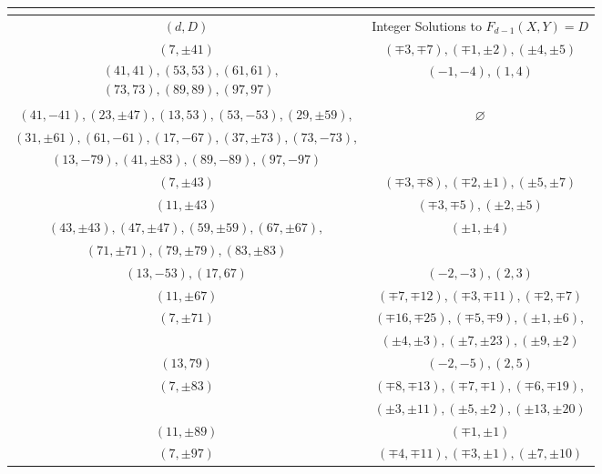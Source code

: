 \documentclass[12pt]{amsart}
\newcommand{\?}{\color{red}?}
\numberwithin{equation}{section}
\begin{document}
\begingroup
\setlength{\tabcolsep}{5pt} %
\renewcommand{\arraystretch}{1.9}
\begin{center} %
\begin{table}[!ht]
\begin{tabular}{|c|c|}
\multicolumn{2}{c}{} \\ \hline
$(d, D)$ & Integer Solutions to $F_{d-1}(X,Y)=D$  \\ \hline \hline
$(7, \pm 41) $ & $(\mp 3, \mp 7), (\mp 1, \pm 2), (\pm 4, \pm 5)  $\\ \hline
$\begin{aligned}&(41, 41), (53, 53), (61,61), \\
&(73, 73), (89,89), (97, 97)\end{aligned}$ & $(-1, -4), (1,4)$ \\ \hline
$(41, -41), (23, \pm 47), (13, 53), (53,-53), (29, \pm 59),$ &  \multirow{3}{3.5em}{$\varnothing$} \\ 
$(31, \pm 61), (61, -61), (17,-67), (37, \pm 73), (73,-73),$ & \\
$(13,-79), (41, \pm 83), (89,-89), (97,-97)$ & \\   \hline
$(7,  \pm 43)$ & $(\mp 3, \mp 8), (\mp 2, \pm 1), (\pm 5, \pm 7) $\\ \hline
$(11, \pm 43)$ & $(\mp 3, \mp 5), (\pm 2, \pm 5)$\\ \hline
$(43, \pm 43), (47, \pm 47), (59, \pm 59), (67,\pm 67),$ &  \multirow{2}{3.5em}{$( \pm 1,\pm 4)$}\\
$(71, \pm 71), (79, \pm 79), (83, \pm 83)$ &  \\ \hline
$(13, -53), (17,67)$ & $ (-2,-3), (2, 3)$\\ \hline
$(11, \pm 67)$ & $(\mp 7, \mp 12), (\mp 3, \mp 11), (\mp 2, \mp 7)$ \\ \hline

\multirow{2}{3.5em}{$(7,\pm 71)$} & $(\mp 16, \mp 25), (\mp 5, \mp 9), (\pm 1, \pm 6),$\\ & $(\pm 4, \pm 3), (\pm 7, \pm 23), (\pm 9, \pm 2)$\\ \hline
$(13, 79)$ & $(-2,-5),(2,5)$\\ \hline

\multirow{2}{3.5em}{$(7,\pm 83)$} & $(\mp 8, \mp 13), (\mp 7, \mp 1), (\mp 6, \mp 19),$\\
&  $(\pm 3, \pm 11), (\pm 5, \pm 2), (\pm 13, \pm 20)$\\ \hline
$(11, \pm 89)$ & $(\mp 1, \pm 1) $\\ \hline
$(7,\pm 97)$ & $(\mp 4, \mp 11), (\mp 3, \pm 1), (\pm 7, \pm 10)$\\ \hline

\end{tabular}
\medskip
{}
\label{thueGRHtable}
\end{table}
\end{center}
\endgroup
\end{document}
